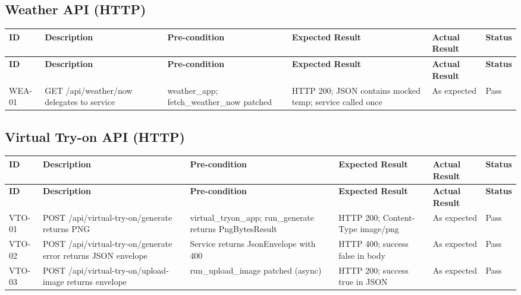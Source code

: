 \begin{appendices}
{\begin{longtable}{|p{1.2cm}|p{3.0cm}|p{3.0cm}|p{3.2cm}|p{2.2cm}|p{1.1cm}|}
\end{longtable}

\subsection*{Weather API (HTTP)}
\begin{longtable}{|p{1.2cm}|p{3.0cm}|p{3.0cm}|p{3.2cm}|p{2.2cm}|p{1.1cm}|}
\hline
\textbf{ID} & \textbf{Description} & \textbf{Pre-condition} & \textbf{Expected Result} & \textbf{Actual Result} & \textbf{Status} \\
\hline
\endfirsthead
\hline
\textbf{ID} & \textbf{Description} & \textbf{Pre-condition} & \textbf{Expected Result} & \textbf{Actual Result} & \textbf{Status} \\
\hline
\endhead
\hline
\endfoot

WEA-01 &
GET /api/weather/now delegates to service &
weather\_app; fetch\_weather\_now patched &
HTTP 200; JSON contains mocked temp; service called once &
As expected &
Pass \\
\hline

\end{longtable}

\subsection*{Virtual Try-on API (HTTP)}
\begin{longtable}{|p{1.2cm}|p{3.0cm}|p{3.0cm}|p{3.2cm}|p{2.2cm}|p{1.1cm}|}
\hline
\textbf{ID} & \textbf{Description} & \textbf{Pre-condition} & \textbf{Expected Result} & \textbf{Actual Result} & \textbf{Status} \\
\hline
\endfirsthead
\hline
\textbf{ID} & \textbf{Description} & \textbf{Pre-condition} & \textbf{Expected Result} & \textbf{Actual Result} & \textbf{Status} \\
\hline
\endhead
\hline
\endfoot

VTO-01 &
POST /api/virtual-try-on/generate returns PNG &
virtual\_tryon\_app; run\_generate returns PngBytesResult &
HTTP 200; Content-Type image/png &
As expected &
Pass \\
\hline

VTO-02 &
POST /api/virtual-try-on/generate error returns JSON envelope &
Service returns JsonEnvelope with 400 &
HTTP 400; success false in body &
As expected &
Pass \\
\hline

VTO-03 &
POST /api/virtual-try-on/upload-image returns envelope &
run\_upload\_image patched (async) &
HTTP 200; success true in JSON &
As expected &
Pass \\
\hline


\end{longtable}}
\end{appendices}
